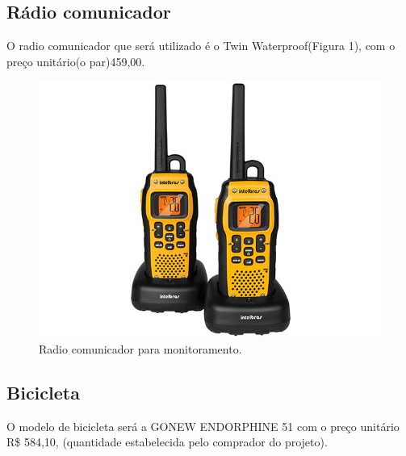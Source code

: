 \subsection{Rádio comunicador}

O radio comunicador  que será utilizado é o Twin Waterproof(Figura 1), com o preço unitário(o par)459,00.

\begin{figure}[H]
	\centering
	\label{Radio comunicador para monitoramento.}
		\includegraphics[keepaspectratio=true,scale=0.5]{monitoramento/radio.jpg}
	\caption{Radio comunicador para monitoramento.}
\end{figure}

\subsection{Bicicleta}

O modelo de bicicleta será a GONEW ENDORPHINE 51 com o preço unitário R\$ 584,10, (quantidade estabelecida pelo comprador do projeto). 

